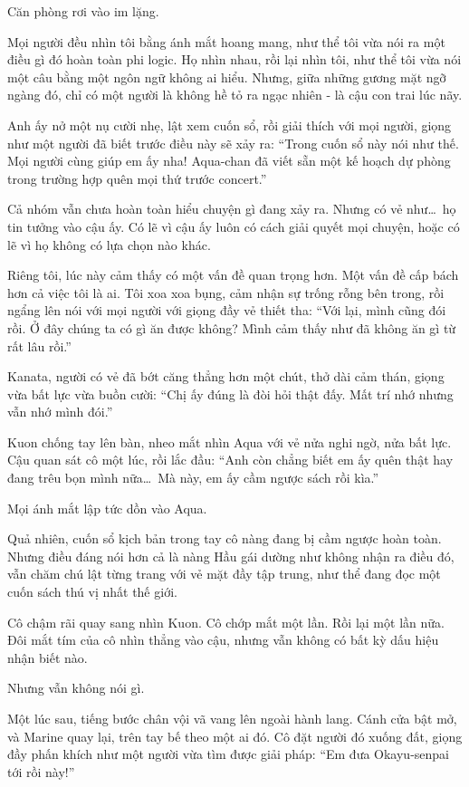 \documentclass[../main.tex]{subfiles}
\begin{document}
Căn phòng rơi vào im lặng.

Mọi người đều nhìn tôi bằng ánh mắt hoang mang, như thể tôi vừa nói ra một điều gì đó hoàn toàn phi logic. Họ nhìn nhau, rồi lại nhìn tôi, như thể tôi vừa nói một câu bằng một ngôn ngữ không ai hiểu. Nhưng, giữa những gương mặt ngỡ ngàng đó, chỉ có một người là không hề tỏ ra ngạc nhiên - là cậu con trai lúc nãy.

Anh ấy nở một nụ cười nhẹ, lật xem cuốn sổ, rồi giải thích với mọi người, giọng như một người đã biết trước điều này sẽ xảy ra: ``Trong cuốn sổ này nói như thế. Mọi người cùng giúp em ấy nha! Aqua-chan đã viết sẵn một kế hoạch dự phòng trong trường hợp quên mọi thứ trước concert.''

Cả nhóm vẫn chưa hoàn toàn hiểu chuyện gì đang xảy ra. Nhưng có vẻ như\dots\ họ tin tưởng vào cậu ấy. Có lẽ vì cậu ấy luôn có cách giải quyết mọi chuyện, hoặc có lẽ vì họ không có lựa chọn nào khác.

Riêng tôi, lúc này cảm thấy có một vấn đề quan trọng hơn. Một vấn đề cấp bách hơn cả việc tôi là ai. Tôi xoa xoa bụng, cảm nhận sự trống rỗng bên trong, rồi ngẩng lên nói với mọi người với giọng đầy vẻ thiết tha: ``Với lại, mình cũng đói rồi. Ở đây chúng ta có gì ăn được không? Mình cảm thấy như đã không ăn gì từ rất lâu rồi.''

Kanata, người có vẻ đã bớt căng thẳng hơn một chút, thở dài cảm thán, giọng vừa bất lực vừa buồn cười: ``Chị ấy đúng là đòi hỏi thật đấy. Mất trí nhớ nhưng vẫn nhớ mình đói.''

\pov{-}

Kuon chống tay lên bàn, nheo mắt nhìn Aqua với vẻ nửa nghi ngờ, nửa bất lực. Cậu quan sát cô một lúc, rồi lắc đầu: ``Anh còn chẳng biết em ấy quên thật hay đang trêu bọn mình nữa\dots\ Mà này, em ấy cầm ngược sách rồi kìa.''

Mọi ánh mắt lập tức dồn vào Aqua.

Quả nhiên, cuốn sổ kịch bản trong tay cô nàng đang bị cầm ngược hoàn toàn. Nhưng điều đáng nói hơn cả là nàng Hầu gái dường như không nhận ra điều đó, vẫn chăm chú lật từng trang với vẻ mặt đầy tập trung, như thể đang đọc một cuốn sách thú vị nhất thế giới.

Cô chậm rãi quay sang nhìn Kuon. Cô chớp mắt một lần. Rồi lại một lần nữa. Đôi mắt tím của cô nhìn thẳng vào cậu, nhưng vẫn không có bất kỳ dấu hiệu nhận biết nào.

Nhưng vẫn không nói gì.

Một lúc sau, tiếng bước chân vội vã vang lên ngoài hành lang. Cánh cửa bật mở, và Marine quay lại, trên tay bế theo một ai đó. Cô đặt người đó xuống đất, giọng đầy phấn khích như một người vừa tìm được giải pháp: ``Em đưa Okayu-senpai tới rồi này!''
\end{document}
